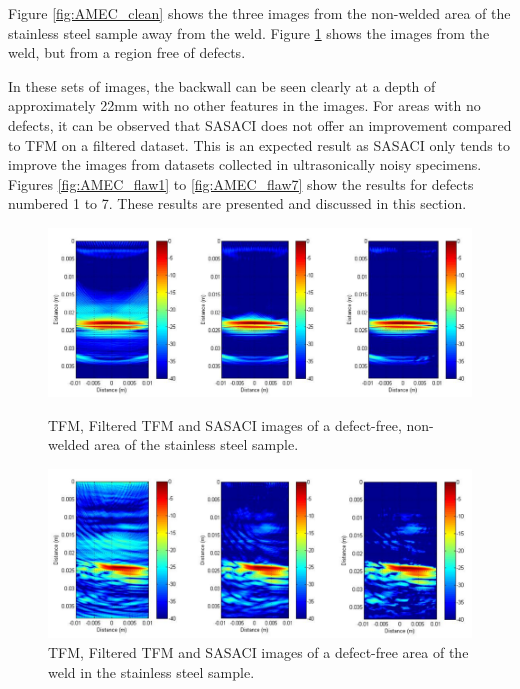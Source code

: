 Figure \ref{fig:AMEC_clean} shows the three images from the non-welded area of the stainless steel sample away from the weld. Figure \ref{fig:AMEC_clean_weld} shows the images from the weld, but from a region free of defects.

In these sets of images, the backwall can be seen clearly at a depth of approximately 22mm with no other features in the images. For areas with no defects, it can be observed that SASACI does not offer an improvement compared to TFM on a filtered dataset. This is an expected result as SASACI only tends to improve the images from datasets collected in ultrasonically noisy specimens. Figures \ref{fig:AMEC_flaw1} to \ref{fig:AMEC_flaw7} show the results for defects numbered 1 to 7. These results are presented and discussed in this section.

\begin{figure}[p]
\centering
		\includegraphics[width=\textwidth]{AMEC3.png}
		\caption{TFM, Filtered TFM and SASACI images of a defect-free, non-welded area of the stainless steel sample.}
		\label{fig:AMEC_clean}
		\vspace{20mm}

		\includegraphics[width=\textwidth]{AMEC4.png}
		\caption{TFM, Filtered TFM and SASACI images of a defect-free area of the weld in the stainless steel sample.}
		\label{fig:AMEC_clean_weld}
\end{figure}

\clearpage

\clearpage

